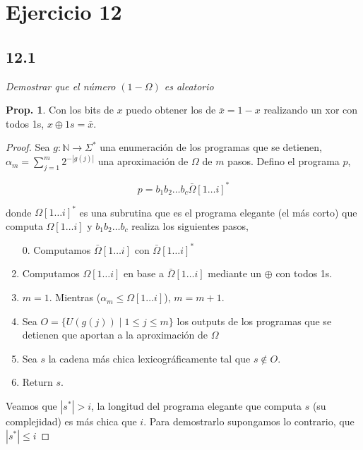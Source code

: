 \documentclass{article}
\theoremstyle{definition} %
\newtheorem{proposition}{Prop.}
\newcommand{\first}[2]{#2[1 \dots #1]}
\begin{document}
\section*{Ejercicio 12}

\subsection*{12.1}

\textit{Demostrar que el número $(1 - \Omega)$ es aleatorio}

\begin{proposition}\label{prop:xor-bits}
    Con los bits de $x$ puedo obtener los de $\bar{x} = 1 - x$ realizando un xor con
    todos 1s, $x \oplus 1s = \bar{x}$.
\end{proposition}

\begin{proof}
    Sea $g: \mathbb{N} \to \Sigma^*$ una enumeración de los programas que se
    detienen, $\alpha_m = \sum_{j = 1}^{m} 2 ^ {-|g(j)|}$ una aproximación de
    $\Omega$ de $m$ pasos. Defino el programa $p$,

    \[
        p = b_1 b_2 \dots b_c \first{i}{\bar{\Omega}}^*
    \]

    donde $\first{i}{\Omega}^*$ es una subrutina que es el
    programa elegante (el más corto) que computa $\first{i}{\Omega}$ y $b_1 b_2
    \dots b_c$ realiza los siguientes pasos,

    \begin{enumerate}
        \item[0.] Computamos $\first{i}{\bar{\Omega}}$ con
        $\first{i}{\bar{\Omega}}^*$
        \item Computamos $\first{i}{\Omega}$ en base a
        $\first{i}{\bar{\Omega}}$ mediante un $\oplus$ con todos 1s.
        \item $m = 1$. Mientras ($\alpha_m \leq \first{i}{\Omega}$), $m = m + 1$.
        \item Sea $O = \{ U(g(j)) \mid 1 \leq j \leq m \}$ los outputs de los
        programas que se detienen que aportan a la aproximación de $\Omega$
        \item Sea $s$ la cadena más chica lexicográficamente tal que $s \notin O$.
        \item Return $s$.
    \end{enumerate}

    Veamos que $|s^*| > i$, la longitud del programa elegante que computa $s$
    (su complejidad) es más chica que $i$. Para demostrarlo supongamos lo
    contrario, que $|s^*| \leq i$


\end{proof}
\end{document}
